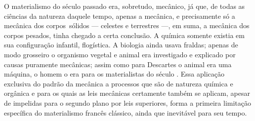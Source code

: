 O materialismo do século passado era, sobretudo, mecânico, já que, de
todas as ciências da natureza daquele tempo, apenas a mecânica, e
precisamente só a mecânica dos corpos\est\ sólidos --- celestes e terrestres ---, %
em suma, a mecânica dos corpos pesados, tinha chegado a certa conclusão.
A química somente existia em sua configuração infantil, flogística.
A biologia ainda
usava fraldas; apenas de modo grosseiro o organismo vegetal e animal
era investigado e explicado por causas puramente mecânicas; assim
como
para Descartes o
animal era uma máquina, o homem o era para os materialistas do século
. Essa aplicação exclusiva do padrão da mecânica a processos que
são de natureza química e orgânica e para os quais as leis mecânicas
certamente também se aplicam, apesar de impelidas para o segundo plano
por leis superiores, forma a primeira limitação específica do
materialismo francês clássico, ainda que inevitável para seu tempo.

